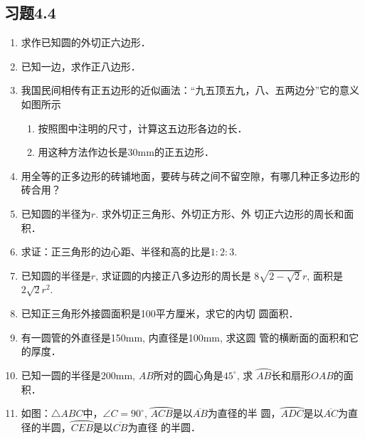 \subsection*{习题4.4}
\begin{enumerate}
    \item 求作已知圆的外切正六边形．

    \item 已知一边，求作正八边形．
    \item 我国民间相传有正五边形的近似画法：“九五顶五九，八、五两边分”它的意义如图所示
\begin{enumerate}
    \item 按照图中注明的尺寸，计算这五边形各边的长．
    \item 用这种方法作边长是30mm的正五边形．
\end{enumerate}

\begin{figure}[htp]
    \centering
    \caption{}
\end{figure}

\item 用全等的正多边形的砖铺地面，要砖与砖之间不留空隙，有哪几种正多边形的砖合用？
\item 已知圆的半径为$r$. 求外切正三角形、外切正方形、外
切正六边形的周长和面积．
\item 求证：正三角形的边心距、半径和高的比是$1:2:3$.
\item 已知圆的半径是$r$, 求证圆的内接正八多边形的周长是
$8\sqrt{2-\sqrt{2}}r$, 面积是$2\sqrt{2}r^2$.
\item 已知正三角形外接圆面积是100平方厘米，求它的内切
圆面积．
\item 有一圆管的外直径是150mm, 内直径是100mm, 求这圆
管的横断面的面积和它的厚度．
\item 已知一圆的半径是200mm, $AB$所对的圆心角是$45^{\circ}$, 求
$\wideparen{AB}$长和扇形$OAB$的面积．
\item 如图：$\triangle ABC$中，$\angle C=90^{\circ}$, $\wideparen{ACB}$是以$\overline{AB}$为直径的半
圆，$\wideparen{ADC}$是以$\overline{AC}$为直径的半圆，$\wideparen{CEB}$是以$\overline{CB}$为直径
的半圆．


\end{enumerate}
